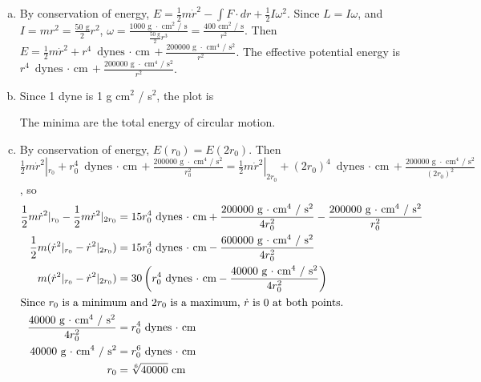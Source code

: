 \documentclass{esg8012pset}
\begin{document}
\begin{solution}
\begin{enumerate}[(a)]
  \item By conservation of energy, $E = \frac{1}{2} m \dot r^2 - \int F\cdot d r + \frac{1}{2}I\omega^2$.  Since $L = I\omega$, and $I = m r^2 = \frac{50\text{ g}}{2}r^2$, $\omega = \frac{1000\text{ g $\cdot$ cm$^2$ / s}}{\frac{50\text{ g}}{2}r^3} = \frac{400\text{ cm$^2$ / s}}{r^2}$.  Then $E = \frac{1}{2}m\dot r^2 + r^4\text{ dynes $\cdot$ cm} + \frac{200000\text{ g $\cdot$ cm$^4$ / s$^2$}}{r^2}$.  The effective potential energy is $r^4\text{ dynes $\cdot$ cm} + \frac{200000\text{ g $\cdot$ cm$^4$ / s$^2$}}{r^2}$.
  \item Since 1 dyne is 1 g cm$^2$ / s$^2$, the plot is \par
{} \par The minima are the total energy of circular motion.
  \item By conservation of energy, $E(r_0) = E(2r_0)$.  Then $\frac{1}{2}m\dot r^2|_{r_0} + r_0^4\text{ dynes $\cdot$ cm} + \frac{200000\text{ g $\cdot$ cm$^4$ / s$^2$}}{r_0^2} = \frac{1}{2}m\dot r^2|_{2r_0} + (2r_0)^4\text{ dynes $\cdot$ cm} + \frac{200000\text{ g $\cdot$ cm$^4$ / s$^2$}}{(2r_0)^2}$, so \begin{align*}
  \frac{1}{2}m\dot r^2|_{r_0} - \frac{1}{2}m\dot r^2|_{2r_0} & =  15r_0^4\text{ dynes $\cdot$ cm} + \frac{200000\text{ g $\cdot$ cm$^4$ / s$^2$}}{4r_0^2} - \frac{200000\text{ g $\cdot$ cm$^4$ / s$^2$}}{r_0^2} \\
  \frac{1}{2}m(\dot r^2|_{r_0} - \dot r^2|_{2r_0}) & =  15r_0^4\text{ dynes $\cdot$ cm} - \frac{600000\text{ g $\cdot$ cm$^4$ / s$^2$}}{4r_0^2} \\
  m(\dot r^2|_{r_0} - \dot r^2|_{2r_0}) & =  30\left(r_0^4\text{ dynes $\cdot$ cm} - \frac{40000\text{ g $\cdot$ cm$^4$ / s$^2$}}{4r_0^2}\right) \\
  \intertext{Since $r_0$ is a minimum and $2r_0$ is a maximum, $\dot r$ is 0 at both points.}
  \frac{40000\text{ g $\cdot$ cm$^4$ / s$^2$}}{4r_0^2} & =  r_0^4\text{ dynes $\cdot$ cm} \\
  40000\text{ g $\cdot$ cm$^4$ / s$^2$} & =  r_0^6\text{ dynes $\cdot$ cm} \\
  r_0 & = \sqrt[6]{40000}\text{ cm}
  \end{align*}
\end{enumerate}
\end{solution}
\end{document}
